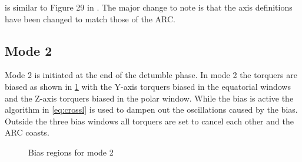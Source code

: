 is similar to Figure 29 in \cite{Mentch11}. The major change to note is that the axis definitions have been changed to match those of the \ac{ARC}.

\subsection{Mode 2}

Mode 2 is initiated at the end of the detumble phase. In mode 2 the torquers are biased as shown in \cref{fig:m2b} with the Y-axis torquers biased in the equatorial windows and the Z-axis torquers biased in the polar window. While the bias is active the algorithm in \cref{eq:crossl} is used to dampen out the oscillations caused by the bias. Outside the three bias windows all torquers are set to cancel each other and the \ac{ARC} coasts.

\begin{figure}[htb!]
    \centering
    
    \caption{Bias regions for mode 2}
    \label{fig:m2b}
\end{figure}

